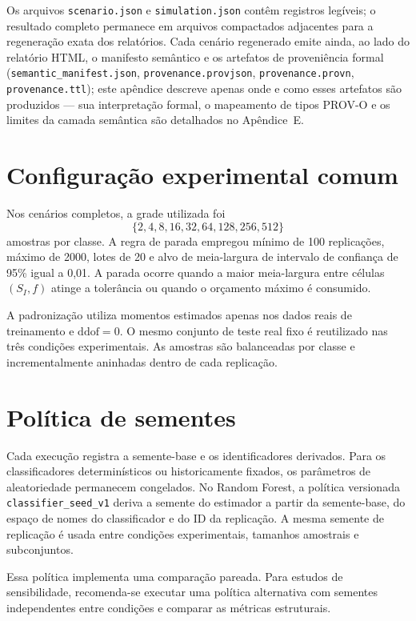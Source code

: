 Os arquivos \texttt{scenario.json} e \texttt{simulation.json} contêm registros legíveis; o resultado completo permanece em arquivos compactados adjacentes para a regeneração exata dos relatórios. Cada cenário regenerado emite ainda, ao lado do relatório HTML, o manifesto semântico e os artefatos de proveniência formal (\texttt{semantic\_manifest.json}, \texttt{provenance.provjson}, \texttt{provenance.provn}, \texttt{provenance.ttl}); este apêndice descreve apenas onde e como esses artefatos são produzidos --- sua interpretação formal, o mapeamento de tipos PROV-O e os limites da camada semântica são detalhados no Apêndice~E.

\section{Configuração experimental comum}

Nos cenários completos, a grade utilizada foi
\[
\{2,4,8,16,32,64,128,256,512\}
\]
amostras por classe. A regra de parada empregou mínimo de 100 replicações, máximo de 2000, lotes de 20 e alvo de meia-largura de intervalo de confiança de 95\% igual a 0,01. A parada ocorre quando a maior meia-largura entre células $(S_I,f)$ atinge a tolerância ou quando o orçamento máximo é consumido.

A padronização utiliza momentos estimados apenas nos dados reais de treinamento e $\mathrm{ddof}=0$. O mesmo conjunto de teste real fixo é reutilizado nas três condições experimentais. As amostras são balanceadas por classe e incrementalmente aninhadas dentro de cada replicação.

\section{Política de sementes}

Cada execução registra a semente-base e os identificadores derivados. Para os classificadores determinísticos ou historicamente fixados, os parâmetros de aleatoriedade permanecem congelados. No Random Forest, a política versionada \texttt{classifier\_seed\_v1} deriva a semente do estimador a partir da semente-base, do espaço de nomes do classificador e do ID da replicação. A mesma semente de replicação é usada entre condições experimentais, tamanhos amostrais e subconjuntos.

Essa política implementa uma comparação pareada. Para estudos de sensibilidade, recomenda-se executar uma política alternativa com sementes independentes entre condições e comparar as métricas estruturais.

